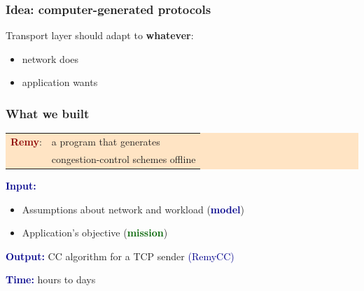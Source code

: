 \documentclass[svgnames]{beamer}
\newcommand{\ssline}{\vspace{8 pt}}
\begin{document}
\begin{frame}
\frametitle{Idea: computer-generated protocols}

\Large Transport layer should adapt to \textbf{whatever}:

\begin{itemize}
\item network does 

\item application wants 

\end{itemize}

\vspace{\baselineskip}
\vspace{\baselineskip}

\scriptsize


\vspace{\baselineskip}
\vspace{\baselineskip}


\end{frame}

\begin{frame}
\frametitle{What we built}

\colorbox{Bisque}{
\begin{centering}
\noindent \begin{tabular}{ll}
\Large \textcolor{DarkRed}{\bf Remy}: & \Large a program that generates \\ & \Large congestion-control schemes offline
\end{tabular}

\end{centering}}

\ssline
\ssline

\textcolor{DarkBlue}{\bf Input:}

\begin{itemize}
\item Assumptions about network and workload (\textbf{\textcolor{DarkBlue}{model}})

\item Application's objective (\textbf{\textcolor{DarkGreen}{mission}})
\end{itemize}

\textcolor{DarkBlue}{\bf Output:} CC algorithm for a TCP sender \hspace{0.177 cm}\textcolor{DarkBlue}{(RemyCC)}

\ssline

\textcolor{DarkBlue}{\bf Time:} hours to days

\end{frame}
\end{document}
